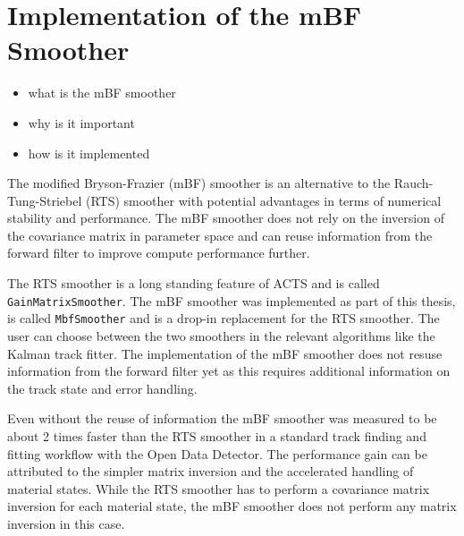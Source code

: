 \section{Implementation of the mBF Smoother}

\begin{itemize}
    \color{red}
    \item what is the mBF smoother
    \item why is it important
    \item how is it implemented
\end{itemize}

The modified Bryson-Frazier (mBF) smoother is an alternative to the Rauch-Tung-Striebel (RTS) smoother with potential advantages in terms of numerical stability and performance. The mBF smoother does not rely on the inversion of the covariance matrix in parameter space and can reuse information from the forward filter to improve compute performance further.

The RTS smoother is a long standing feature of ACTS and is called \texttt{GainMatrixSmoother}. The mBF smoother was implemented as part of this thesis, is called \texttt{MbfSmoother} and is a drop-in replacement for the RTS smoother. The user can choose between the two smoothers in the relevant algorithms like the Kalman track fitter. The implementation of the mBF smoother does not resuse information from the forward filter yet as this requires additional information on the track state and error handling.

Even without the reuse of information the mBF smoother was measured to be about 2 times faster than the RTS smoother in a standard track finding and fitting workflow with the Open Data Detector. The performance gain can be attributed to the simpler matrix inversion and the accelerated handling of material states. While the RTS smoother has to perform a covariance matrix inversion for each material state, the mBF smoother does not perform any matrix inversion in this case.
